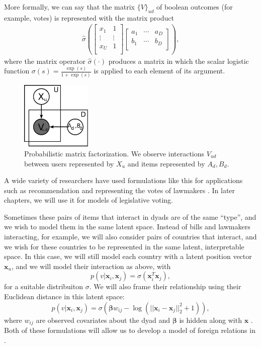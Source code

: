 More formally, we can say that the matrix $\{V\}_{ud}$ of boolean
outcomes (for example, votes) is represented with the matrix product
\begin{align}
  \hat \sigma \left( \left[ \begin{array}{cc}
    x_1 & 1 \\
    \vdots & \vdots \\
    x_U & 1 \\
  \end{array}
  \right]
  \left[
    \begin{array}{ccc}
      a_1 & \cdots & a_D \\
      b_1 & \cdots & b_D \\
    \end{array}
    \right]
  \right),
\end{align}
where the matrix operator $\hat \sigma(\cdot)$ produces a matrix in
which the scalar logistic function $\sigma(s) = \frac{\exp(s)}{1 +
  \exp(s)}$ is applied to each element of its argument.

\begin{figure}
  \begin{center}
  \includegraphics[width=0.3\textwidth]{chapter_introductory_material/figs/irt_gm.pdf}
  \end{center}
  \caption{Probabilistic matrix factorization.  We observe
    interactions $V_{ud}$ between users represented by $X_u$ and items
    represented by $A_d, B_d$.}
  \label{fig:irt_gm}
\end{figure}

A wide variety of researchers have used formulations like this for
applications such as recommendation and representing the votes of
lawmakers
\citep{wang:2011,salakhutdinov:2008a,poole:1985,poole:1991,clinton:2004}. In
later chapters, we will use it for models of legislative voting.

Sometimes these pairs of items that interact in dyads are of the same
``type'', and we wish to model them in the same latent space.  Instead
of bills and lawmakers interacting, for example, we will also consider
pairs of countries that interact, and we wish for these countries to
be represented in the same latent, interpretable space.  In this case,
we will still model each country with a latent position vector $\bm
x_u$, and we will model their interaction as above, with
\[
  p(v | \bm x_i, \bm x_j) = \sigma(\bm x_i^T \bm x_j),
\]
for a suitable distribuiton $\sigma$.  We will also frame their
relationship using their Euclidean distance
in this latent space:
\[
  p(v | \bm x_i, \bm x_j) = \sigma(\bm \beta w_{ij} - \log(|| \bm x_i
  - \bm x_j ||_2^2 + 1)),
\]
where $w_{ij}$ are observed covariates about the dyad and $\bm \beta$
is hidden along with $\bm x$ \citep{hoff:2002}. Both of these
formulations will allow us to develop a model of foreign relations in
.

